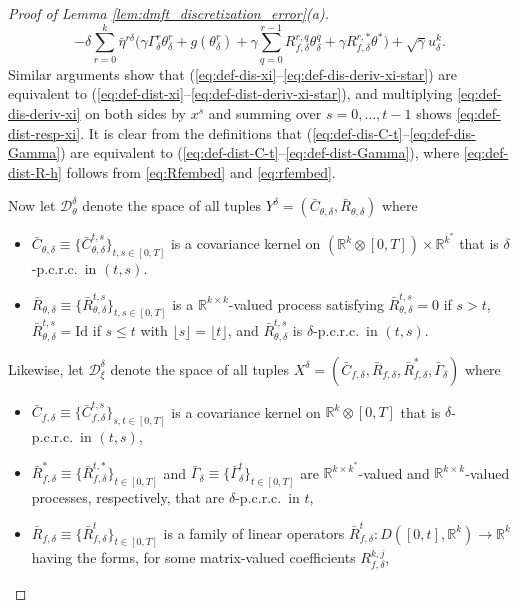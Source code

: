 \documentclass[11pt,letterpaper,reqno]{amsart}
\theoremstyle{definition}
\def\R{\mathbb{R}}
\def\Id{\mathrm{Id}}
\def\cD{\mathcal{D}}
\newcommand{\flr}[1]{{\lfloor {#1} \rfloor}}
\begin{document}
\begin{proof}[Proof of Lemma \ref{lem:dmft_discretization_error}(a)]
\[-\delta \sum_{r=0}^k
\bar\eta^{r\delta}\Big(\gamma \Gamma_\delta^r\theta_\delta^r
+g(\theta_\delta^r)+\gamma \sum_{q=0}^{r-1} R_{f,\delta}^{r,q}
\theta_\delta^q+\gamma R_{f,\delta}^{r,*}\theta^*\Big)
+\sqrt{\gamma}u_\delta^k.\]
Similar arguments show that
(\ref{eq:def-dis-xi}--\ref{eq:def-dis-deriv-xi-star}) are equivalent to
(\ref{eq:def-dist-xi}--\ref{eq:def-dist-deriv-xi-star}), and multiplying
\eqref{eq:def-dis-deriv-xi} on both sides by $x^s$ and summing over
$s=0,\ldots,t-1$ shows \eqref{eq:def-dist-resp-xi}. It is clear from the
definitions that
(\ref{eq:def-dis-C-t}--\ref{eq:def-dis-Gamma}) are equivalent to
(\ref{eq:def-dist-C-t}--\ref{eq:def-dist-Gamma}), where \eqref{eq:def-dist-R-h}
follows from \eqref{eq:Rfembed} and \eqref{eq:rfembed}.

Now let $\cD_\theta^\delta$ denote the space of all tuples
$Y^\delta=(\bar C_{\theta,\delta},\bar R_{\theta,\delta})$ where
\begin{itemize}
\item $\bar C_{\theta,\delta} \equiv \{\bar C_{\theta,\delta}^{t,s}\}_{t,s \in
[0,T]}$ is a covariance kernel on $(\R^k \otimes [0,T]) \times \R^{k^*}$
that is $\delta$-p.c.r.c.\ in $(t,s)$.
\item $\bar R_{\theta,\delta} \equiv \{\bar R_{\theta,\delta}^{t,s}\}_{t,s \in
[0,T]}$ is a $\R^{k \times k}$-valued process satisfying
$\bar R_{\theta,\delta}^{t,s}=0$ if $s>t$,
$\bar R_{\theta,\delta}^{t,s}=\Id$ if $s \leq t$ with $\flr{s}=\flr{t}$,
and $\bar R_{\theta,\delta}^{t,s}$ is $\delta$-p.c.r.c.\ in $(t,s)$.
\end{itemize}
Likewise, let $\cD_\xi^\delta$ denote the space of all tuples
$X^\delta=(\bar C_{f,\delta},\bar R_{f,\delta}, \bar R_{f,\delta}^*,
\bar \Gamma_\delta)$ where
\begin{itemize}
\item $\bar C_{f,\delta} \equiv \{\bar C_{f,\delta}^{t,s}\}_{s,t \in [0,T]}$
is a covariance kernel on $\R^k \otimes [0,T]$ that is $\delta$-p.c.r.c.\ in
$(t,s)$,
\item $\bar R_{f,\delta}^* \equiv \{\bar R_{f,\delta}^{t,*}\}_{t \in [0,T]}$
and $\bar \Gamma_\delta \equiv \{\bar \Gamma_\delta^t\}_{t \in [0,T]}$ are
$\R^{k \times k^*}$-valued and $\R^{k \times k}$-valued processes,
respectively, that are $\delta$-p.c.r.c.\ in $t$,
\item $\bar R_{f,\delta} \equiv \{\bar R_{f,\delta}^t\}_{t \in [0,T]}$ is a
family of linear operators $\bar R_{f,\delta}^t:D([0,t],\R^k) \to \R^k$ having
the forms, for some matrix-valued coefficients $R_{f,\delta}^{k,j}$,

\end{itemize}
\end{proof}
\end{document}
